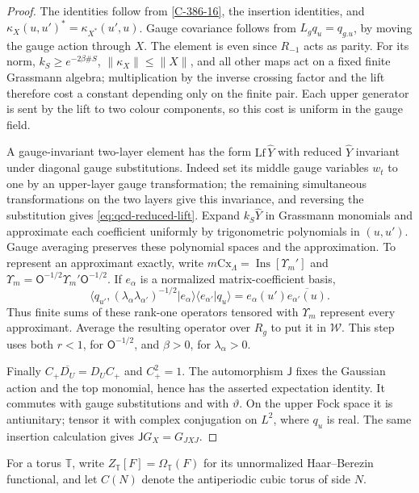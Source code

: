 \documentclass[11pt,letterpaper,reqno]{amsart}
\theoremstyle{definition}
\theoremstyle{remark}
\begin{document}
\begin{proof}
The identities follow from \eqref{C-386-16}, the insertion
identities, and $\kappa_X(u,u')^*=\kappa_{X^*}(u',u)$.
Gauge covariance follows from $L_gq_u=q_{g.u}$, by moving the
gauge action through $X$. The element is even since
$R_{-1}$ acts as parity. For its norm, $k_S\ge e^{-2\beta\#S}$,
$\|\kappa_X\|\le\|X\|$, and all other maps act on a fixed
finite Grassmann algebra; multiplication by the inverse crossing
factor and the lift therefore cost a constant depending only on
the finite pair. Each upper generator is sent by the lift to two
colour components, so this cost is uniform in the gauge field.

A gauge-invariant two-layer element has the form
$\mathrm{Lf}\,\widehat Y$ with reduced $\widehat Y$ invariant
under diagonal gauge substitutions. Indeed set its middle gauge
variables $w_t$ to one by an upper-layer gauge transformation;
the remaining simultaneous transformations on the two layers give
this invariance, and reversing the substitution gives
\eqref{eq:qcd-reduced-lift}. Expand $k_S\widehat Y$ in
Grassmann monomials and approximate each coefficient uniformly
by trigonometric polynomials in $(u,u')$. Gauge averaging preserves
these polynomial spaces and the approximation. To represent an
approximant exactly, write
$m\mathrm{Cx}_\Lambda=\operatorname{Ins}[\Upsilon_m']$
and $\Upsilon_m=\mathsf O^{-1/2}\Upsilon_m'\mathsf O^{-1/2}$.
If $e_\alpha$ is a normalized matrix-coefficient basis,
\[
 \langle q_{u'},
    (\lambda_\alpha\lambda_{\alpha'})^{-1/2}
       |e_\alpha\rangle\langle e_{\alpha'}|q_u\rangle
       =e_\alpha(u')\overline{e_{\alpha'}(u)}.
\]
Thus finite sums of these rank-one operators tensored with
$\Upsilon_m$ represent every approximant. Average the resulting
operator over $R_g$ to put it in $\mathcal W$.
This step uses both $r<1$, for $\mathsf O^{-1/2}$, and
$\beta>0$, for $\lambda_\alpha>0$.

Finally $C_+\overline{D_U}=D_UC_+$ and $C_+^2=1$.
The automorphism $\mathsf J$ fixes the Gaussian action and the
top monomial, hence has the asserted expectation identity.
It commutes with gauge substitutions and with $\vartheta$.
On the upper Fock space it is antiunitary; tensor it with complex
conjugation on $L^2$, where $q_u$ is real. The same insertion
calculation gives $\mathsf JG_X=G_{JXJ}$.
\end{proof}

For a torus $\mathbb T$, write $Z_{\mathbb T}[F]=\Omega_{\mathbb T}(F)$
for its unnormalized Haar--Berezin functional, and let $C(N)$
denote the antiperiodic cubic torus of side $N$.
\end{document}
